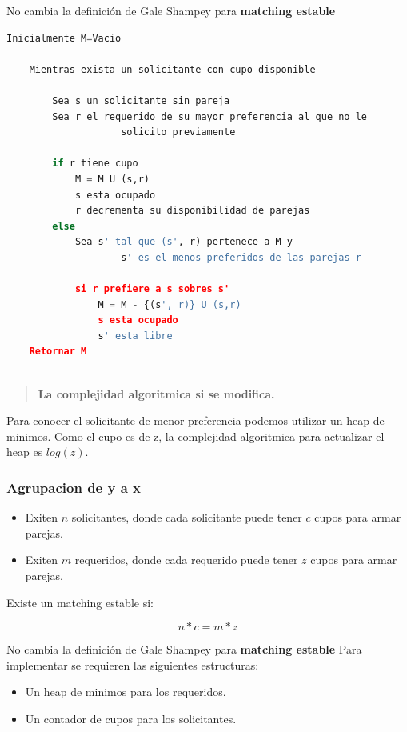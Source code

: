 \documentclass{article}
\begin{document}
No cambia la definición de Gale Shampey para \textbf{matching estable}

\begin{lstlisting}[language=Python, caption=Algoritmo de requeridos con cupos]
    Inicialmente M=Vacio
    
    Mientras exista un solicitante con cupo disponible
    
        Sea s un solicitante sin pareja
        Sea r el requerido de su mayor preferencia al que no le
                    solicito previamente
            
        if r tiene cupo 
            M = M U (s,r)
            s esta ocupado
            r decrementa su disponibilidad de parejas
        else
            Sea s' tal que (s', r) pertenece a M y 
                    s' es el menos preferidos de las parejas r

            si r prefiere a s sobres s'
                M = M - {(s', r)} U (s,r)
                s esta ocupado
                s' esta libre
    Retornar M
    
\end{lstlisting}    
\begin{quote}
    \textbf{La complejidad algoritmica si se modifica.}
\end{quote}
Para conocer el solicitante de menor preferencia podemos utilizar un heap de minimos. Como el cupo es de z, la complejidad algoritmica para actualizar el heap es \(log (z)\).

\newpage
\subsubsection{Agrupacion de y a x}
\begin{itemize}
    \item Exiten \(n\) solicitantes, donde cada solicitante puede tener \(c\) cupos para armar parejas.
    \item Exiten \(m\) requeridos, donde cada requerido puede tener \(z\) cupos para armar parejas.
\end{itemize}


Existe un matching estable si:

\begin{equation} \label{eu_eqn}
    n*c=m*z
\end{equation}


No cambia la definición de Gale Shampey para \textbf{matching estable}
\newline
Para implementar se requieren las siguientes estructuras:
\begin{itemize}
    \item Un heap de minimos para los requeridos.
    \item Un contador de cupos para los solicitantes.
\end{itemize}
\end{document}
